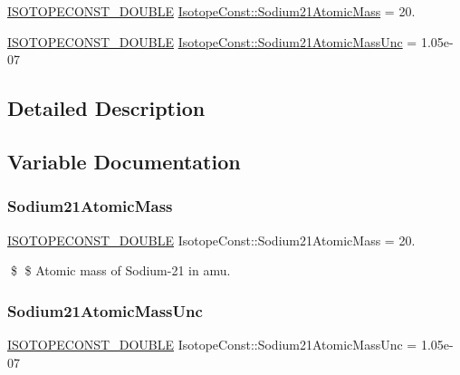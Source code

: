 \begin{DoxyCompactItemize}
\item 
\mbox{\hyperlink{group___isotope_const-_macros_ga8f45a7272ce02c0b4c65c44636ed719a}{I\+S\+O\+T\+O\+P\+E\+C\+O\+N\+S\+T\+\_\+\+D\+O\+U\+B\+LE}} \mbox{\hyperlink{group___isotope_const-_sodium-_na21_ga1f6c3aed5ce4e8134d9fd55dff5ea9e7}{Isotope\+Const\+::\+Sodium21\+Atomic\+Mass}} = 20.
\item 
\mbox{\hyperlink{group___isotope_const-_macros_ga8f45a7272ce02c0b4c65c44636ed719a}{I\+S\+O\+T\+O\+P\+E\+C\+O\+N\+S\+T\+\_\+\+D\+O\+U\+B\+LE}} \mbox{\hyperlink{group___isotope_const-_sodium-_na21_gad26743c6c10c83814bbc63fc0554fd2f}{Isotope\+Const\+::\+Sodium21\+Atomic\+Mass\+Unc}} = 1.\+05e-\/07
\end{DoxyCompactItemize}


\subsection{Detailed Description}


\subsection{Variable Documentation}
\mbox{\label{group___isotope_const-_sodium-_na21_ga1f6c3aed5ce4e8134d9fd55dff5ea9e7}} 
\subsubsection{\texorpdfstring{Sodium21\+Atomic\+Mass}{Sodium21AtomicMass}}
{\footnotesize\ttfamily \mbox{\hyperlink{group___isotope_const-_macros_ga8f45a7272ce02c0b4c65c44636ed719a}{I\+S\+O\+T\+O\+P\+E\+C\+O\+N\+S\+T\+\_\+\+D\+O\+U\+B\+LE}} Isotope\+Const\+::\+Sodium21\+Atomic\+Mass = 20.}

\$ \$ Atomic mass of Sodium-\/21 in amu. \mbox{\label{group___isotope_const-_sodium-_na21_gad26743c6c10c83814bbc63fc0554fd2f}} 
\subsubsection{\texorpdfstring{Sodium21\+Atomic\+Mass\+Unc}{Sodium21AtomicMassUnc}}
{\footnotesize\ttfamily \mbox{\hyperlink{group___isotope_const-_macros_ga8f45a7272ce02c0b4c65c44636ed719a}{I\+S\+O\+T\+O\+P\+E\+C\+O\+N\+S\+T\+\_\+\+D\+O\+U\+B\+LE}} Isotope\+Const\+::\+Sodium21\+Atomic\+Mass\+Unc = 1.\+05e-\/07}

